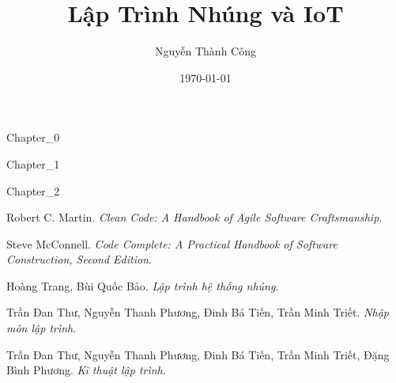 \documentclass[12pt,a5paper]{book}
\title{Lập Trình Nhúng và IoT}
\date{\today}
\author{Nguyễn Thành Công}
\begin{document}
\maketitle

\tableofcontents

{Chapter_0}

{Chapter_1}

{Chapter_2}

\begin{thebibliography}{9}
Robert C. Martin. 
\textit{Clean Code: A Handbook of Agile Software Craftsmanship}. 
 
Steve McConnell.
\textit{Code Complete: A Practical Handbook of Software Construction, Second Edition}.

Hoàng Trang, Bùi Quốc Bảo.
\textit{Lập trình hệ thống nhúng}.

Trần Đan Thư, Nguyễn Thanh Phương, Đinh Bá Tiến, Trần Minh Triết.
\textit{Nhập môn lập trình}.

Trần Đan Thư, Nguyễn Thanh Phương, Đinh Bá Tiến, Trần Minh Triết, Đặng Bình Phương.
\textit{Kĩ thuật lập trình}.

\end{thebibliography}
\end{document}
